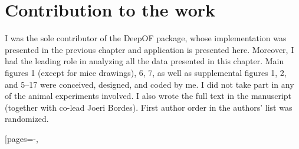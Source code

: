 \section{Contribution to the work}

I was the sole contributor of the DeepOF package, whose implementation was presented in the previous chapter and application is presented here. Moreover, I had the leading role in analyzing all the data presented in this chapter. Main figures 1 (except for mice drawings), 6, 7, as well as supplemental figures 1, 2, and 5--17 were conceived, designed, and coded by me. I did not take part in any of the animal experiments involved. I also wrote the full text in the manuscript (together with co-lead Joeri Bordes). First author order in the authors' list was randomized.


[pages={-},

